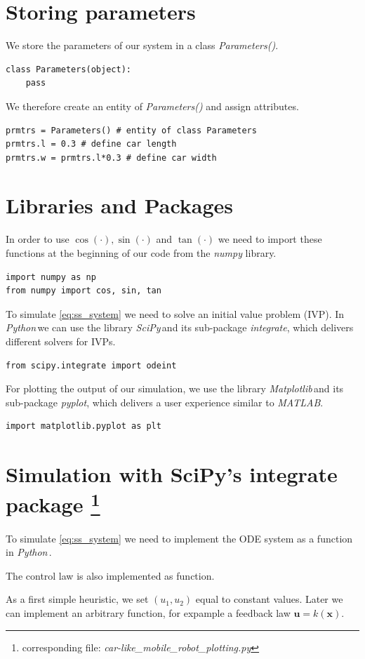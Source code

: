 \documentclass[a4paper,11pt,headings=standardclasses]{scrartcl}%
\newcommand{\py}{\emph{Python}\,}
\newcommand{\scipy}{\emph{SciPy}\,}
\newcommand{\mpl}{\emph{Matplotlib}\,}
\newcommand{\uu}{\mathbf{u}}
\newcommand{\x}{\mathbf{x}}
\begin{document}
\section{Storing parameters}
We store the parameters of our system in a class \emph{Parameters()}.
\begin{lstlisting}
class Parameters(object):
    pass
\end{lstlisting}
We therefore create an entity of \emph{Parameters()} and assign attributes.
\begin{lstlisting}
prmtrs = Parameters() # entity of class Parameters
prmtrs.l = 0.3 # define car length
prmtrs.w = prmtrs.l*0.3 # define car width
\end{lstlisting}

\section{Libraries and Packages}
In order to use $\cos(\cdot), \sin(\cdot)$ and $\tan(\cdot)$ we need to import these functions at the beginning of our code from the \emph{numpy} library.
\begin{lstlisting}
import numpy as np 
from numpy import cos, sin, tan
\end{lstlisting}
To simulate \eqref{eq:ss_system} we need to solve an initial value problem (IVP). In \py we can use the library \scipy and its sub-package \emph{integrate}, which delivers different solvers for IVPs.
\begin{lstlisting}
from scipy.integrate import odeint
\end{lstlisting}
For plotting the output of our simulation, we use the library \mpl and its sub-package \emph{pyplot}, which delivers a user experience similar to \emph{MATLAB}.
\begin{lstlisting}
import matplotlib.pyplot as plt
\end{lstlisting}
\section[Simulation with SciPy's integrate package]{Simulation with SciPy's integrate package \protect\footnote{corresponding file: \emph{car-like\_mobile\_robot\_plotting.py}}}
\label{sec:simulation}
To simulate \eqref{eq:ss_system} we need to implement the ODE system as a function in \py.

The control law is also implemented as function.

As a first simple heuristic, we set $(u_1, u_2)$ equal to constant values. Later we can implement an arbitrary function, for expample a feedback law $\uu=k(\x)$.
\end{document}

